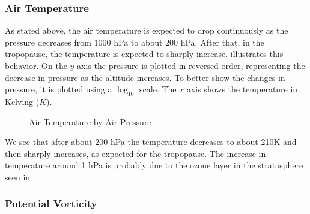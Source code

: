 \documentclass[../00_main.tex]{subfiles}
\begin{document}
\subsubsection{Air Temperature}

As stated above, the air temperature is expected to drop continuously as the
pressure decreases from 1000 hPa to about 200 hPa. After that, in the
tropopause, the temperature is expected to sharply increase. 
illustrates this behavior. On the $y$ axis the pressure is plotted in reversed
order, representing the decrease in pressure as the altitude increases. To
better show the changes in pressure, it is plotted using a $\log_{10}$ scale. 
The $x$ axis shows the temperature in Kelving ($K$).
\begin{figure}[H]
\center
    \vspace{-20pt}
    \caption{Air Temperature by Air Pressure}
    \label{temp}
\end{figure}
We see that after about 200 hPa the temperature decreases to about 210K and
then sharply increases, as expected for the tropopause. The increase in
temperature around 1 hPa is probably due to the ozone layer in the stratosphere
seen in .

\subsubsection{Potential Vorticity}
\end{document}
